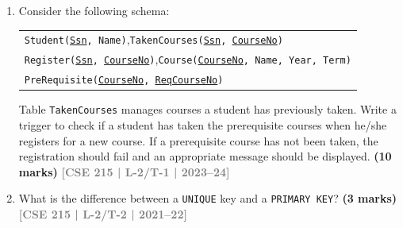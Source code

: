 \documentclass[12pt,a3paper]{article}
\newcommand{\yr}[1]{\hfill\textcolor{gray}{\small\textbf{[#1]}}}
\newcommand{\mk}[1]{\textcolor{orange!70!black}{\small\textbf{(#1 marks)}}}
\begin{document}
\begin{enumerate}

\item Consider the following schema:
\begin{center}
\begin{tabular}{l}
\texttt{Student(\underline{Ssn}, Name)},\quad \texttt{TakenCourses(\underline{Ssn}, \underline{CourseNo})}\\
\texttt{Register(\underline{Ssn}, \underline{CourseNo})},\quad \texttt{Course(\underline{CourseNo}, Name, Year, Term)}\\
\texttt{PreRequisite(\underline{CourseNo}, \underline{ReqCourseNo})}
\end{tabular}
\end{center}
Table \texttt{TakenCourses} manages courses a student has previously taken. Write a trigger to check if a student has taken the prerequisite courses when he/she registers for a new course. If a prerequisite course has not been taken, the registration should fail and an appropriate message should be displayed.
\mk{10} \yr{CSE 215 | L-2/T-1 | 2023--24}

\item What is the difference between a \texttt{UNIQUE} key and a \texttt{PRIMARY KEY}?
\mk{3} \yr{CSE 215 | L-2/T-2 | 2021--22}


\end{enumerate}
\end{document}

